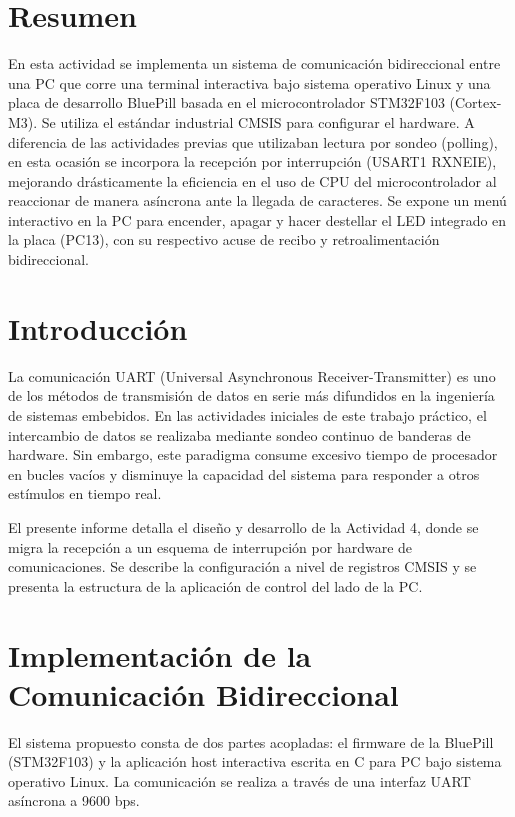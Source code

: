 \documentclass{plantilla}
\begin{document}

\maketitle

\section{Resumen}
En esta actividad se implementa un sistema de comunicación bidireccional entre una PC que corre una terminal interactiva bajo sistema operativo Linux y una placa de desarrollo BluePill basada en el microcontrolador STM32F103 (Cortex-M3). Se utiliza el estándar industrial CMSIS para configurar el hardware. A diferencia de las actividades previas que utilizaban lectura por sondeo (polling), en esta ocasión se incorpora la recepción por interrupción (USART1 RXNEIE), mejorando drásticamente la eficiencia en el uso de CPU del microcontrolador al reaccionar de manera asíncrona ante la llegada de caracteres. Se expone un menú interactivo en la PC para encender, apagar y hacer destellar el LED integrado en la placa (PC13), con su respectivo acuse de recibo y retroalimentación bidireccional.

\section{Introducción}
La comunicación UART (Universal Asynchronous Receiver-Transmitter) es uno de los métodos de transmisión de datos en serie más difundidos en la ingeniería de sistemas embebidos. En las actividades iniciales de este trabajo práctico, el intercambio de datos se realizaba mediante sondeo continuo de banderas de hardware. Sin embargo, este paradigma consume excesivo tiempo de procesador en bucles vacíos y disminuye la capacidad del sistema para responder a otros estímulos en tiempo real. 

El presente informe detalla el diseño y desarrollo de la Actividad 4, donde se migra la recepción a un esquema de interrupción por hardware de comunicaciones. Se describe la configuración a nivel de registros CMSIS y se presenta la estructura de la aplicación de control del lado de la PC.

\section{Implementación de la Comunicación Bidireccional}

El sistema propuesto consta de dos partes acopladas: el firmware de la BluePill (STM32F103) y la aplicación host interactiva escrita en C para PC bajo sistema operativo Linux. La comunicación se realiza a través de una interfaz UART asíncrona a 9600 bps.
\end{document}
